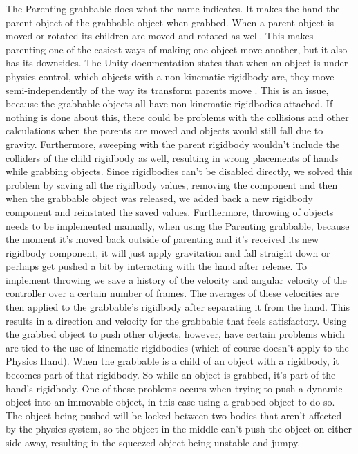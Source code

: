 The Parenting grabbable does what the name indicates. It makes the hand the parent object of the grabbable object when grabbed. When a parent object is moved or rotated its children are moved and rotated as well. This makes parenting one of the easiest ways of making one object move another, but it also has its downsides. The Unity documentation states that when an object is under physics control, which objects with a non-kinematic rigidbody are, they move semi-independently of the way its transform parents move \parencite{UnityManualRigidbody2017}. This is an issue, because the grabbable objects all have non-kinematic rigidbodies attached. If nothing is done about this, there could be problems with the collisions and other calculations when the parents are moved and objects would still fall due to gravity. Furthermore, sweeping with the parent rigidbody wouldn't include the colliders of the child rigidbody as well, resulting in wrong placements of hands while grabbing objects. Since rigidbodies can't be disabled directly, we solved this problem by saving all the rigidbody values, removing the component and then when the grabbable object was released, we added back a new rigidbody component and reinstated the saved values. Furthermore, throwing of objects needs to be implemented manually, when using the Parenting grabbable, because the moment it's moved back outside of parenting and it's received its new rigidbody component, it will just apply gravitation and fall straight down or perhaps get pushed a bit by interacting with the hand after release. To implement throwing we save a history of the velocity and angular velocity of the controller over a certain number of frames. The averages of these velocities are then applied to the grabbable's rigidbody after separating it from the hand. This results in a direction and velocity for the grabbable that feels satisfactory. Using the grabbed object to push other objects, however, have certain problems which are tied to the use of kinematic rigidbodies (which of course doesn't apply to the Physics Hand). When the grabbable is a child of an object with a rigidbody, it becomes part of that rigidbody. So while an object is grabbed, it's part of the hand's rigidbody. One of these problems occurs when trying to push a dynamic object into an immovable object, in this case using a grabbed object to do so. The object being pushed will be locked between two bodies that aren't affected by the physics system, so the object in the middle can't push the object on either side away, resulting in the squeezed object being unstable and jumpy.

